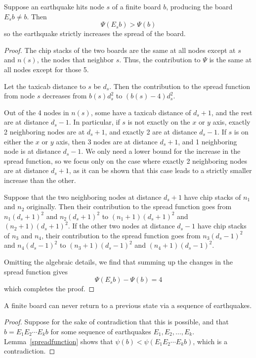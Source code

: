 \documentclass[runningheads,a4paper]{llncs}
\begin{document}
\begin{lemma}
\label{spreadfunction}
Suppose an earthquake hits node $s$ of a finite board $b$, producing the board $E_sb \neq b$. Then
\begin{equation*}
\Psi(E_sb) > \Psi(b) 
\end{equation*}
so the earthquake strictly increases the spread of the board.
\end{lemma}
\begin{proof}
The chip stacks of the two boards are the same at all nodes except at $s$ and $n(s)$, the nodes that neighbor $s$. Thus, the contribution to $\Psi$ is the same at all nodes except for those 5.

Let the taxicab distance to $s$ be $d_s$. Then the contribution to the spread function from node $s$ decreases from $b(s)d_s^2$ to $(b(s)-4)d_s^2$.

Out of the 4 nodes in $n(s)$, some have a taxicab distance of $d_s+1$, and the rest are at distance $d_s-1$. In particular, if $s$ is not exactly on the $x$ or $y$ axis, exactly 2 neighboring nodes are at $d_s+1$, and exactly 2 are at distance $d_s-1$. If $s$ is on either the $x$ or $y$ axis, then 3 nodes are at distance $d_s+1$, and 1 neighboring node is at distance $d_s-1$. We only need a lower bound for the increase in the spread function, so we focus only on the case where exactly 2 neighboring nodes are at distance $d_s+1$, as it can be shown that this case leads to a strictly smaller increase than the other.

Suppose that the two neighboring nodes at distance $d_s+1$ have chip stacks of $n_1$ and $n_2$ originally. Then their contribution to the spread function goes from $n_1(d_s+1)^2$ and $n_2(d_s+1)^2$ to $(n_1+1)(d_s+1)^2$ and $(n_2+1)(d_s+1)^2$. If the other two nodes at distance $d_s-1$ have chip stacks of $n_3$ and $n_4$, their contribution to the spread function goes from $n_3(d_s-1)^2$ and $n_4(d_s-1)^2$ to $(n_3+1)(d_s-1)^2$ and $(n_4+1)(d_s-1)^2$.

Omitting the algebraic details, we find that summing up the changes in the spread function gives
\begin{equation*}
 \Psi(E_sb) - \Psi(b) = 4
 \end{equation*}
which completes the proof.
\end{proof}

\begin{corollary}
\label{norepeats}
A finite board can never return to a previous state via a sequence of earthquakes.
\end{corollary}
\begin{proof}
Suppose for the sake of contradiction that this is possible, and that $b = E_1E_2\cdots E_kb$ for some sequence of earthquakes $E_1,E_2,\dots,E_k$. Lemma~\ref{spreadfunction} shows that $\psi(b) < \psi(E_1E_2\cdots E_kb)$, which is a contradiction.
\end{proof} 
\end{document}
